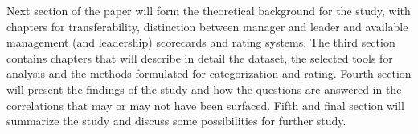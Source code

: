 Next section of the paper will form the theoretical background for the study,
with chapters for transferability, distinction between manager and leader and
available management (and leadership) scorecards and rating systems. The third
section contains chapters that will describe in detail the dataset, the selected
tools for analysis and the methods formulated for categorization and rating. 
Fourth section will present the findings of the study and how the questions are
answered in the correlations that may or may not have been surfaced. Fifth and
final section will summarize the study and discuss some possibilities for
further study.

